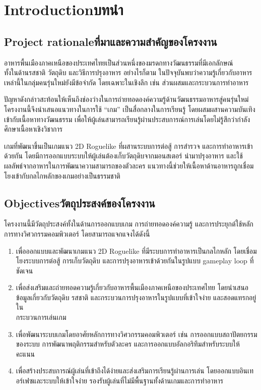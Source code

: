 \chapter{\ifenglish Introduction\else บทนำ\fi}

\section{\ifenglish Project rationale\else ที่มาและความสำคัญของโครงงาน\fi}
    
    \hspace{1.5em}อาหารพื้นเมืองภาคเหนือของประเทศไทยเป็นส่วนหนึ่งของมรดกทางวัฒนธรรมที่มีเอกลักษณ์ \\ทั้งในด้านรสชาติ วัตถุดิบ และวิธีการปรุงอาหาร 
    อย่างไรก็ตาม ในปัจจุบันพบว่าความรู้เกี่ยวกับอาหารเหล่านี้ในกลุ่มคนรุ่นใหม่ยังมีข้อจำกัด โดยเฉพาะในเชิงลึก เช่น ส่วนผสมและกระบวนการทำอาหาร

    ปัญหาดังกล่าวสะท้อนให้เห็นถึงช่องว่างในการถ่ายทอดองค์ความรู้ด้านวัฒนธรรมอาหารสู่คนรุ่นใหม่ \\โครงงานนี้จึงนำเสนอแนวทางในการใช้ “เกม” เป็นสื่อกลางในการเรียนรู้ โดยผสมผสานความบันเทิงเข้ากับเนื้อหาทางวัฒนธรรม เพื่อให้ผู้เล่นสามารถเรียนรู้ผ่านประสบการณ์การเล่นโดยไม่รู้สึกว่ากำลังศึกษาเนื้อหาเชิงวิชาการ

    เกมที่พัฒนาขึ้นเป็นเกมแนว 2D Roguelike ที่ผสานระบบการต่อสู้ การสำรวจ และการทำอาหารเข้าด้วยกัน โดยมีการออกแบบระบบให้ผู้เล่นต้องเก็บวัตถุดิบจากมอนสเตอร์ นำมาปรุงอาหาร และใช้ผลลัพธ์จากอาหารในการพัฒนาความสามารถของตัวละคร แนวทางนี้ช่วยให้เนื้อหาด้านอาหารถูกเชื่อมโยงเข้ากับกลไกหลักของเกมอย่างเป็นธรรมชาติ

\section{\ifenglish Objectives\else วัตถุประสงค์ของโครงงาน\fi}

    \hspace{1.5em}โครงงานนี้มีวัตถุประสงค์ทั้งในด้านการออกแบบเกม การถ่ายทอดองค์ความรู้ และการประยุกต์ใช้หลักการทางวิศวกรรมคอมพิวเตอร์ โดยสามารถแจกแจงได้ดังนี้

    \begin{enumerate}
    \item เพื่อออกแบบและพัฒนาเกมแนว 2D Roguelike ที่มีระบบการทำอาหารเป็นกลไกหลัก โดยเชื่อมโยงระบบการต่อสู้ การเก็บวัตถุดิบ และการปรุงอาหารเข้าด้วยกันในรูปแบบ gameplay loop ที่ชัดเจน
    \item เพื่อส่งเสริมและถ่ายทอดความรู้เกี่ยวกับอาหารพื้นเมืองภาคเหนือของประเทศไทย โดยนำเสนอข้อมูลเกี่ยวกับวัตถุดิบ รสชาติ และกระบวนการปรุงอาหารในรูปแบบที่เข้าใจง่าย และสอดแทรกอยู่ใน\\กระบวนการเล่นเกม
    \item เพื่อพัฒนาระบบเกมโดยอาศัยหลักการทางวิศวกรรมคอมพิวเตอร์ เช่น การออกแบบสถาปัตยกรรม\\ของระบบ การพัฒนาพฤติกรรมสำหรับตัวละคร และการออกแบบอัลกอริทึมสำหรับระบบให้คะแนน
    \item เพื่อสร้างประสบการณ์ผู้เล่นที่เข้าถึงได้ง่ายและส่งเสริมการเรียนรู้ผ่านการเล่น โดยออกแบบอินเทอร์เฟซและระบบให้เข้าใจง่าย รองรับผู้เล่นที่ไม่มีพื้นฐานทั้งด้านเกมและการทำอาหาร
\end{enumerate}
\newpage
